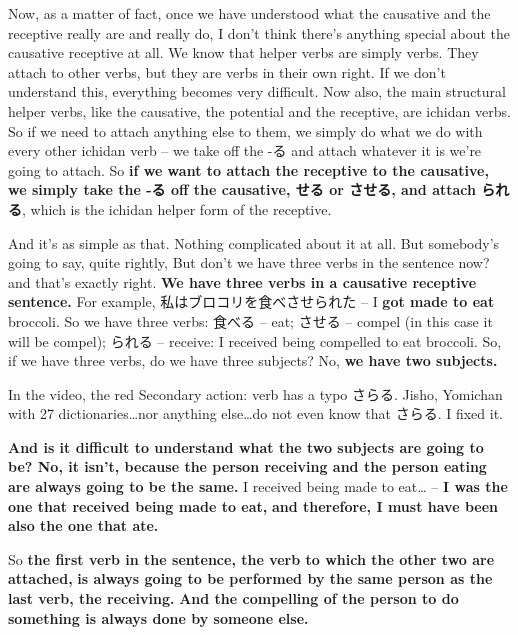 \startsectionlevel[title={Causative receptive / causative passive},reference={causative-receptive-causative-passive}]

Now, as a matter of fact, once we have understood what the causative and the receptive really are and really do, I don't think there's anything special about the causative receptive at all. We know that helper verbs are simply verbs. They attach to other verbs, but they are verbs in their own right. If we don't understand this, everything becomes very difficult. Now also, the main structural helper verbs, like the causative, the potential and the receptive, are ichidan verbs. So if we need to attach anything else to them, we simply do what we do with every other ichidan verb -- we take off the -る and attach whatever it is we're going to attach. So {\bf if we want to attach the receptive to the causative, we simply take the -る off the causative, せる or させる, and attach られる}, which is the ichidan helper form of the receptive.

{}

And it's as simple as that. Nothing complicated about it at all. But somebody's going to say, quite rightly, But don't we have three verbs in the sentence now? and that's exactly right. {\bf We have three verbs in a causative receptive sentence.} For example, 私はブロコリを食べさせられた -- I {\bf got made to eat} broccoli. So we have three verbs: 食べる -- eat; させる -- compel (in this case it will be compel); られる -- receive: I received being compelled to eat broccoli. So, if we have three verbs, do we have three subjects? No, {\bf we have two subjects.}

{}

In the video, the red Secondary action: verb has a typo さらる. Jisho, Yomichan with 27 dictionaries\ldots{}nor anything else\ldots{}do not even know that さらる. I fixed it.

{}

{\bf And is it difficult to understand what the two subjects are going to be? No, it isn't, because the person receiving and the person eating are always going to be the same.} I received being made to eat\ldots{} -- {\bf I was the one that received being made to eat,} {\bf and therefore, I must have been also the one that ate.}

\thinrule

So {\bf the first verb in the sentence, the verb to which the other two are attached,} {\bf is always going to be performed by the same person as the last verb, the receiving.} {\bf And the compelling of the person to do something is always done by someone else.}

